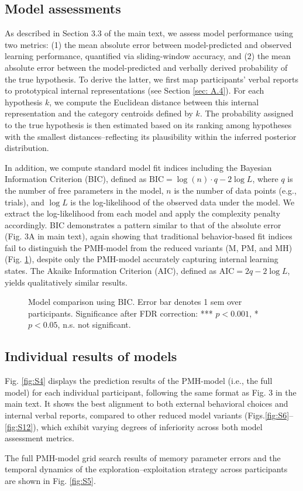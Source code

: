 \subsection{Model assessments}
As described in Section 3.3 of the main text, we assess model performance using two metrics: (1) the mean absolute error between model-predicted and observed learning performance, quantified via sliding-window accuracy, and (2) the mean absolute error between the model-predicted and verbally derived probability of the true hypothesis. To derive the latter, we first map participants’ verbal reports to prototypical internal representations (see Section \ref{sec: A.4}). For each hypothesis $k$, we compute the Euclidean distance between this internal representation and the category centroids defined by $k$. The probability assigned to the true hypothesis is then estimated based on its ranking among hypotheses with the smallest distances--reflecting its plausibility within the inferred posterior distribution.

In addition, we compute standard model fit indices including the Bayesian Information Criterion (BIC), defined as $\mathrm{BIC} = \log(n) \cdot q - 2 \log L$, where $q$ is the number of free parameters in the model, $n$ is the number of data points (e.g., trials), and $\log L$ is the log-likelihood of the observed data under the model. We extract the log-likelihood from each model and apply the complexity penalty accordingly. BIC demonstrates a pattern similar to that of the absolute error (Fig. 3A in main text), again showing that traditional behavior-based fit indices fail to distinguish the PMH-model from the reduced variants (M, PM, and MH) (Fig. \ref{fig:S3}), despite only the PMH-model accurately capturing internal learning states. The Akaike Information Criterion (AIC), defined as $\mathrm{AIC} = 2q - 2 \log L$, yields qualitatively similar results.

\begin{figure}[htbp]
  \centering
    
  \caption{Model comparison using BIC. Error bar denotes 1 sem over participants. Significance after FDR correction: *** $p < 0.001$, * $p < 0.05$, n.s. not significant.}
  \label{fig:S3}
\end{figure}


\subsection{Individual results of models}

Fig. \ref{fig:S4} displays the prediction results of the PMH-model (i.e., the full model) for each individual participant, following the same format as Fig. 3 in the main text. It shows the best alignment to both external behavioral choices and internal verbal reports, compared to other reduced model variants (Figs.\ref{fig:S6}–\ref{fig:S12}), which exhibit varying degrees of inferiority across both model assessment metrics.

The full PMH-model grid search results of memory parameter errors and the temporal dynamics of the exploration–exploitation strategy across participants are shown in Fig. \ref{fig:S5}.


